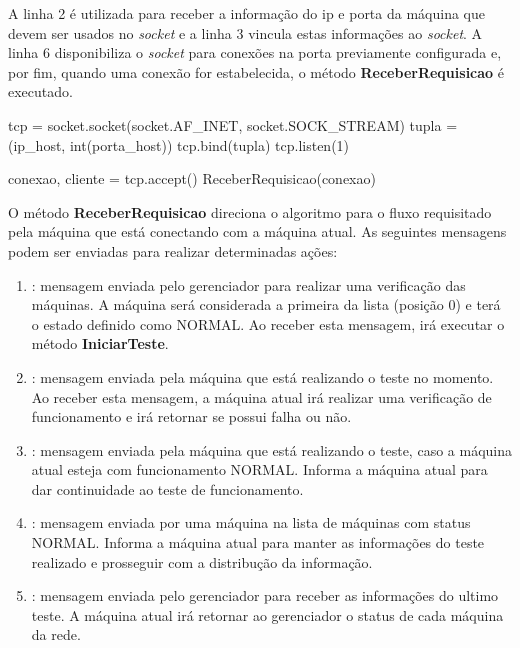 A linha 2 é utilizada para receber a informação do ip e porta da máquina que devem ser usados no \textit{socket} e a linha 3 vincula estas informações ao \textit{socket}. A linha 6 disponibiliza o \textit{socket} para conexões na porta previamente
configurada e, por fim, quando uma conexão for estabelecida, o método \textbf{ReceberRequisicao} é executado.

\vspace*{1cm}
\begin{python}
    tcp = socket.socket(socket.AF_INET, socket.SOCK_STREAM)
    tupla = (ip_host, int(porta_host))
    tcp.bind(tupla)
    tcp.listen(1)

    conexao, cliente = tcp.accept() 
    ReceberRequisicao(conexao)
\end{python}
\vspace*{1cm}

O método \textbf{ReceberRequisicao} direciona o algoritmo para o fluxo requisitado pela máquina que está conectando com a máquina atual. As seguintes mensagens podem ser enviadas para realizar determinadas ações:

\vspace*{1cm}
\begin{enumerate}
    \item \textbf{}: mensagem enviada pelo gerenciador para realizar uma verificação das máquinas. A máquina será considerada a primeira da lista (posição 0) e terá o estado definido como NORMAL. Ao receber esta mensagem,
    irá executar o método \textbf{IniciarTeste}.
    \item \textbf{}: mensagem enviada pela máquina que está realizando o teste no momento. Ao receber esta mensagem, a máquina atual irá realizar uma verificação de funcionamento e 
    irá retornar se possui falha ou não.
    \item \textbf{}: mensagem enviada pela máquina que está realizando o teste, caso a máquina atual esteja com funcionamento NORMAL. Informa a máquina atual para dar continuidade ao teste de funcionamento.
    \item \textbf{}: mensagem enviada por uma máquina na lista de máquinas com status NORMAL. Informa a máquina atual para manter as informações do teste realizado e prosseguir com a distribução da informação.
    \item \textbf{}: mensagem enviada pelo gerenciador para receber as informações do ultimo teste. A máquina atual irá retornar ao gerenciador o status de cada máquina da rede.
  \end{enumerate}

